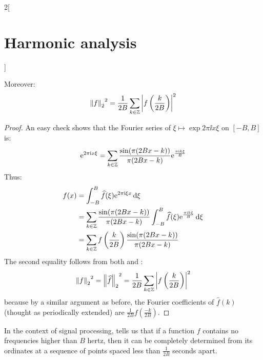 \documentclass[../../../main_math.tex]{subfiles}
\begin{document}
\begin{multicols}{2}[\section{Harmonic analysis}]
\begin{theorem}
    Moreover: $${\left\|f\right\|_2}^2=\frac{1}{2B}\sum_{k\in\mathbb{Z}}\abs{f\left(\frac{k}{2B}\right)}^2$$
  \end{theorem}
  \begin{proof}
    An easy check shows that the Fourier series of $\xi\mapsto\exp{2\pi\ii x\xi}$ on $[-B, B]$ is: $$\mathrm{e}^{2\pi\mathrm{i} x\xi}=\sum_{k\in\mathbb{Z}}\frac{\sin(\pi(2Bx-k))}{\pi(2Bx-k)}\mathrm{e}^{\frac{\pi\mathrm{i} k\xi}{B}}$$
    Thus:
    \begin{align*}
      f(x) & =\int_{-B}^{B}\widehat{f}(\xi)\mathrm{e}^{2\pi\mathrm{i} \xi x}\dd{\xi}                                                           \\
           & =\sum_{k\in\mathbb{Z}}\frac{\sin(\pi(2Bx-k))}{\pi(2Bx-k)}\int_{-B}^{B}\widehat{f}(\xi)\mathrm{e}^{\frac{\pi\mathrm{i} k\xi}{B}} \dd{\xi} \\
           & =\sum_{k\in\mathbb{Z}}f\left(\frac{k}{2B}\right)\frac{\sin(\pi(2Bx-k))}{\pi(2Bx-k)}
    \end{align*}
    The second equality follows from both  and :
    $${\left\|f\right\|_2}^2={\left\|\widehat{f}\right\|_2}^2=\frac{1}{2B}\sum_{k\in\mathbb{Z}}\abs{f\left(\frac{k}{2B}\right)}^2$$
    because by a similar argument as before, the Fourier coefficients of $\widehat{f}(k)$ (thought as periodically extended) are $\frac{1}{2B}f\left(\frac{-k}{2B}\right)$.
  \end{proof}
  \begin{remark}
    In the context of signal processing,  tells us that if a function $f$ contains no frequencies higher than $B$ hertz, then it can be completely determined from its ordinates at a sequence of points spaced less than $\frac{1}{2B}$ seconds apart.
  \end{remark}

\end{multicols}
\end{document}
